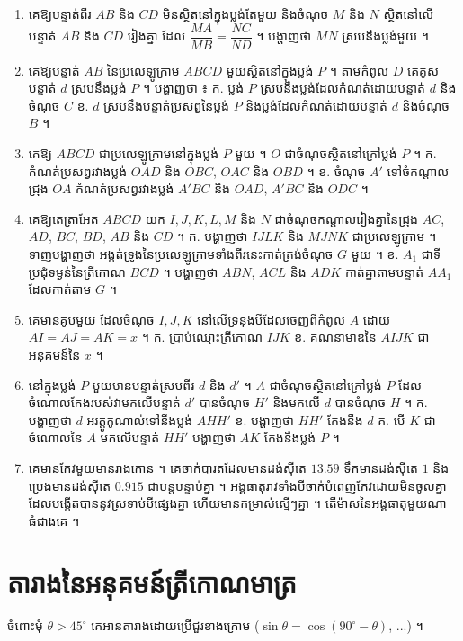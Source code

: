 \begin{enumerate}[1]
  \item គេឱ្យបន្ទាត់ពីរ $AB$ និង $CD$ មិនស្ថិតនៅក្នុងប្លង់តែមួយ និងចំណុច $M$ និង $N$ ស្ថិតនៅលើបន្ទាត់ $AB$ និង $CD$ រៀងគ្នា ដែល $\dfrac{MA}{MB} = \dfrac{NC}{ND}$ ។ បង្ហាញថា $MN$ ស្របនឹងប្លង់មួយ ។
  \item គេឱ្យបន្ទាត់ $AB$ នៃប្រលេឡូក្រាម $ABCD$ មួយស្ថិតនៅក្នុងប្លង់ $P$ ។ តាមកំពូល $D$ គេគូសបន្ទាត់ $d$ ស្របនឹងប្លង់ $P$ ។ បង្ហាញថា ៖ ក. ប្លង់ $P$ ស្របនឹងប្លង់ដែលកំណត់ដោយបន្ទាត់ $d$ និងចំណុច $C$ \quad ខ. $d$ ស្របនឹងបន្ទាត់ប្រសព្វនៃប្លង់ $P$ និងប្លង់ដែលកំណត់ដោយបន្ទាត់ $d$ និងចំណុច $B$ ។
  \item គេឱ្យ $ABCD$ ជាប្រលេឡូក្រាមនៅក្នុងប្លង់ $P$ មួយ ។ $O$ ជាចំណុចស្ថិតនៅក្រៅប្លង់ $P$ ។ \quad ក. កំណត់ប្រសព្វរវាងប្លង់ $OAD$ និង $OBC$, $OAC$ និង $OBD$ ។ \quad ខ. ចំណុច $A'$ ទៅចំកណ្ដាលជ្រុង $OA$ កំណត់ប្រសព្វរវាងប្លង់ $A'BC$ និង $OAD$, $A'BC$ និង $ODC$ ។
  \item គេឱ្យតេត្រាអែត $ABCD$ យក $I, J, K, L, M$ និង $N$ ជាចំណុចកណ្ដាលរៀងគ្នានៃជ្រុង $AC$, $AD$, $BC$, $BD$, $AB$ និង $CD$ ។ \quad ក. បង្ហាញថា $IJLK$ និង $MJNK$ ជាប្រលេឡូក្រាម ។ ទាញបង្ហាញថា អង្កត់ទ្រូងនៃប្រលេឡូក្រាមទាំងពីរនេះកាត់ត្រង់ចំណុច $G$ មួយ ។ \quad ខ. $A_1$ ជាទីប្រជុំទម្ងន់នៃត្រីកោណ $BCD$ ។ បង្ហាញថា $ABN$, $ACL$ និង $ADK$ កាត់គ្នាតាមបន្ទាត់ $AA_1$ ដែលកាត់តាម $G$ ។
  \item គេមានគូបមួយ ដែលចំណុច $I, J, K$ នៅលើទ្រនុងបីដែលចេញពីកំពូល $A$ ដោយ $AI = AJ = AK = x$ ។ \quad ក. ប្រាប់ឈ្មោះត្រីកោណ $IJK$ \quad ខ. គណនាមាឌនៃ $AIJK$ ជាអនុគមន៍នៃ $x$ ។
  \item នៅក្នុងប្លង់ $P$ មួយមានបន្ទាត់ស្របពីរ $d$ និង $d'$ ។ $A$ ជាចំណុចស្ថិតនៅក្រៅប្លង់ $P$ ដែលចំណោលកែងរបស់វាមកលើបន្ទាត់ $d'$ បានចំណុច $H'$ និងមកលើ $d$ បានចំណុច $H$ ។ \quad ក. បង្ហាញថា $d$ អរត្តូកូណាល់ទៅនឹងប្លង់ $AHH'$ \quad ខ. បង្ហាញថា $HH'$ កែងនឹង $d$ \quad គ. បើ $K$ ជាចំណោលនៃ $A$ មកលើបន្ទាត់ $HH'$ បង្ហាញថា $AK$ កែងនឹងប្លង់ $P$ ។
  \item គេមានកែវមួយមានរាងកោន ។ គេចាក់បារតដែលមានដង់ស៊ីតេ $13.59$ ទឹកមានដង់ស៊ីតេ $1$ និងប្រេងមានដង់ស៊ីតេ $0.915$ ជាបន្តបន្ទាប់គ្នា ។ អង្គធាតុរាវទាំងបីចាក់បំពេញកែវដោយមិនចូលគ្នា ដែលបង្កើតបាននូវស្រទាប់បីផ្សេងគ្នា ហើយមានកម្រាស់ស្មើៗគ្នា ។ តើម៉ាសនៃអង្គធាតុមួយណាធំជាងគេ ។
\end{enumerate}

\section*{តារាងនៃអនុគមន៍ត្រីកោណមាត្រ}

ចំពោះមុំ $\theta > 45^\circ$ គេអានតារាងដោយប្រើជួរខាងក្រោម ($\sin\theta = \cos(90^\circ - \theta)$, ...) ។

